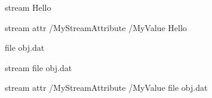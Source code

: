 \endfeature

\bigskip


\pdfrefobj \pdflastobj      %


\immediate \pdfobj stream   %
   {Hello}                  %

\pdfobj stream              %
    attr {/MyStreamAttribute /MyValue} %
    {Hello}
\pdfrefobj \pdflastobj

\pdfobj file {obj.dat}      %
\pdfrefobj \pdflastobj

\pdfobj stream              %
    file {obj.dat}
\pdfrefobj \pdflastobj

\pdfobj stream              %
    attr {/MyStreamAttribute /MyValue} %
    file {obj.dat}
\pdfrefobj \pdflastobj



